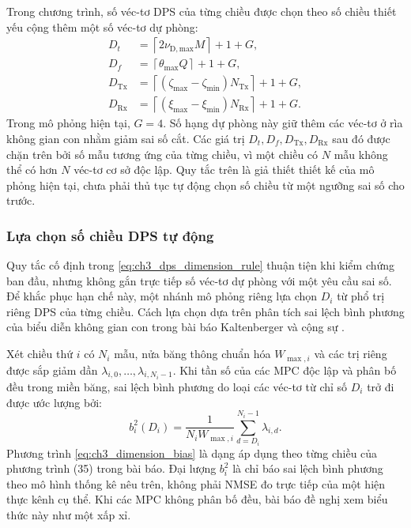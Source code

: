 Trong chương trình, số véc-tơ DPS của từng chiều được chọn theo số chiều thiết yếu cộng thêm một số véc-tơ dự phòng:
\begin{equation}
\begin{aligned}
D_t  &= \left\lceil 2\nu_{\mathrm{D,max}}M \right\rceil + 1 + G,\\
D_f  &= \left\lceil \theta_{\max}Q \right\rceil + 1 + G,\\
D_{\mathrm{Tx}} &= \left\lceil (\zeta_{\max}-\zeta_{\min})N_{\mathrm{Tx}} \right\rceil + 1 + G,\\
D_{\mathrm{Rx}} &= \left\lceil (\xi_{\max}-\xi_{\min})N_{\mathrm{Rx}} \right\rceil + 1 + G.
\end{aligned}
\label{eq:ch3_dps_dimension_rule}
\end{equation}
Trong mô phỏng hiện tại, \(G=4\). Số hạng dự phòng này giữ thêm các véc-tơ ở rìa không gian con nhằm giảm sai số cắt. Các giá trị \(D_t,D_f,D_{\mathrm{Tx}},D_{\mathrm{Rx}}\) sau đó được chặn trên bởi số mẫu tương ứng của từng chiều, vì một chiều có \(N\) mẫu không thể có hơn \(N\) véc-tơ cơ sở độc lập. Quy tắc trên là giả thiết thiết kế của mô phỏng hiện tại, chưa phải thủ tục tự động chọn số chiều từ một ngưỡng sai số cho trước.

\subsubsection{Lựa chọn số chiều DPS tự động}
\label{subsubsec:ch3_adaptive_dps_dimension}

Quy tắc cố định trong \eqref{eq:ch3_dps_dimension_rule} thuận tiện khi kiểm chứng ban đầu, nhưng không gắn trực tiếp số véc-tơ dự phòng với một yêu cầu sai số. Để khắc phục hạn chế này, một nhánh mô phỏng riêng lựa chọn \(D_i\) từ phổ trị riêng DPS của từng chiều. Cách lựa chọn dựa trên phân tích sai lệch bình phương của biểu diễn không gian con trong bài báo Kaltenberger và cộng sự \cite{Kaltenberger2007}.

Xét chiều thứ \(i\) có \(N_i\) mẫu, nửa băng thông chuẩn hóa \(W_{\max,i}\) và các trị riêng được sắp giảm dần \(\lambda_{i,0},\ldots,\lambda_{i,N_i-1}\). Khi tần số của các MPC độc lập và phân bố đều trong miền băng, sai lệch bình phương do loại các véc-tơ từ chỉ số \(D_i\) trở đi được ước lượng bởi:
\begin{equation}
b_i^2(D_i)
=
\frac{1}{N_iW_{\max,i}}
\sum_{d=D_i}^{N_i-1}\lambda_{i,d}.
\label{eq:ch3_dimension_bias}
\end{equation}
Phương trình \eqref{eq:ch3_dimension_bias} là dạng áp dụng theo từng chiều của phương trình (35) trong bài báo. Đại lượng \(b_i^2\) là chỉ báo sai lệch bình phương theo mô hình thống kê nêu trên, không phải NMSE đo trực tiếp của một hiện thực kênh cụ thể. Khi các MPC không phân bố đều, bài báo đề nghị xem biểu thức này như một xấp xỉ.

